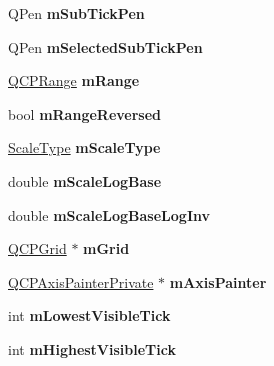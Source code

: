 \begin{DoxyCompactItemize}
\item 
\mbox{\label{class_q_c_p_axis_a32ef56d3a417866720eb12667d27dbd1}} 
Q\+Pen {\bfseries m\+Sub\+Tick\+Pen}
\item 
\mbox{\label{class_q_c_p_axis_aa5cc6afc5dc2a365f5abbd36eb04a1dc}} 
Q\+Pen {\bfseries m\+Selected\+Sub\+Tick\+Pen}
\item 
\mbox{\label{class_q_c_p_axis_a1ee36773c49062d751560e11f90845f7}} 
\mbox{\hyperlink{class_q_c_p_range}{Q\+C\+P\+Range}} {\bfseries m\+Range}
\item 
\mbox{\label{class_q_c_p_axis_a5cb034f57aa3d773a9ca55a0931dbf7b}} 
bool {\bfseries m\+Range\+Reversed}
\item 
\mbox{\label{class_q_c_p_axis_ad706039549cbbbec5fcb2baf7894e04d}} 
\mbox{\hyperlink{class_q_c_p_axis_a36d8e8658dbaa179bf2aeb973db2d6f0}{Scale\+Type}} {\bfseries m\+Scale\+Type}
\item 
\mbox{\label{class_q_c_p_axis_abc727ddb4af745151755d1b5e60d03c3}} 
double {\bfseries m\+Scale\+Log\+Base}
\item 
\mbox{\label{class_q_c_p_axis_a93e068984b475467929e7f6768754227}} 
double {\bfseries m\+Scale\+Log\+Base\+Log\+Inv}
\item 
\mbox{\label{class_q_c_p_axis_a17bffb94aaa40311f259c6ac7bcb5d5f}} 
\mbox{\hyperlink{class_q_c_p_grid}{Q\+C\+P\+Grid}} $\ast$ {\bfseries m\+Grid}
\item 
\mbox{\label{class_q_c_p_axis_aeeae00935bd2dab82d64f32544a90913}} 
\mbox{\hyperlink{class_q_c_p_axis_painter_private}{Q\+C\+P\+Axis\+Painter\+Private}} $\ast$ {\bfseries m\+Axis\+Painter}
\item 
\mbox{\label{class_q_c_p_axis_aebb24ba8734b7e054efc6e1ecc5414c7}} 
int {\bfseries m\+Lowest\+Visible\+Tick}
\item 
\mbox{\label{class_q_c_p_axis_abb3b3ccce7e9779fef2be91ce1a46ef0}} 
int {\bfseries m\+Highest\+Visible\+Tick}

\end{DoxyCompactItemize}
